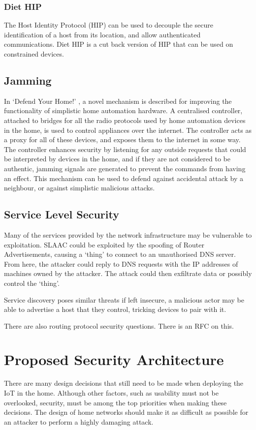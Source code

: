\documentclass[10pt,journal,compsoc]{IEEEtran}
\begin{document}
\subsubsection{Diet HIP}
The Host Identity Protocol (HIP) can be used to decouple the secure
identification of a host from its location, and allow authenticated
communications. Diet HIP is a cut back version of HIP that can be used on
constrained devices. 

\subsection{Jamming}
In `Defend Your Home!' \cite{Brown2013}, a novel mechanism is described for
improving the functionality of simplistic home automation hardware. A
centralised controller, attached to bridges for all the radio protocols used by
home automation devices in the home, is used to control appliances over the
internet. The  controller acts as a proxy for all of these devices, and exposes
them to the internet in some way. The controller  enhances security by
listening for any outside requests that could be interpreted by devices in the
home, and if they are not considered to be authentic, jamming signals are
generated to prevent the commands from having an effect. This mechanism can be
used to defend against accidental attack by a neighbour, or against simplistic
malicious attacks. 

\subsection{Service Level Security}
Many of the services provided by the network infrastructure may be vulnerable
to exploitation. SLAAC could be exploited by the spoofing of Router
Advertisements, causing a `thing' to connect to an unauthorised DNS server.
From here, the attacker could reply to DNS requests with the IP addresses of
machines owned by the attacker. The attack could then exfiltrate data or
possibly control the `thing'.

Service discovery poses similar threats if left insecure, a malicious actor may
be able to advertise a host that they control, tricking devices to pair with
it.

There are also routing protocol security questions. There is an RFC on this.  

\section{Proposed Security Architecture}
There are many design decisions that still need to be made when deploying the
IoT in the home. Although other factors, such as usability must not be
overlooked, security, must be among the top priorities when making these
decisions.  The design of home networks should make it as difficult as possible
for an attacker to perform a highly damaging attack. 
\end{document}
